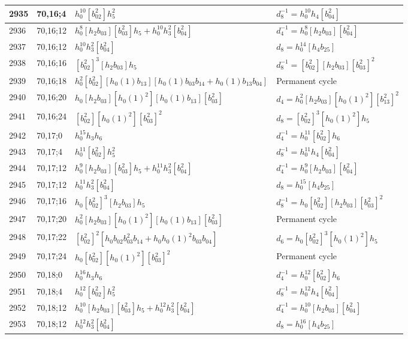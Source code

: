 \documentclass{article}
\begin{document}
\begin{longtable}{|l|l|>{\raggedright\arraybackslash}p{6cm}|>{\raggedright\arraybackslash}p{6cm}|}
\hline
2935 & 70,16;4 & $h_0^{10}[b_{02}^2]h_5^2$ & $d_{8}^{-1}=h_0^{10}h_4[b_{04}^2]$\\
\hline
2936 & 70,16;12 & $h_0^8[h_2b_{03}][b_{03}^2]h_5 + h_0^{10}h_3^2[b_{04}^2]$ & $d_{4}^{-1}=h_0^8[h_2b_{03}][b_{04}^2]$\\
2937 & 70,16;12 & $h_0^{10}h_3^2[b_{04}^2]$ &$d_{8}=h_0^{14}[h_4b_{25}]$\\
\hline
2938 & 70,16;16 & $[b_{02}^2]^3[h_2b_{03}]h_5$ & $d_{8}^{-1}=[b_{02}^2][h_2b_{03}][b_{03}^2]^2$\\
\hline
2939 & 70,16;18 & $h_0^2[b_{02}^2][h_0(1)b_{13}][h_0(1)b_{03}b_{14} + h_0(1)b_{13}b_{04}]$ & Permanent cycle\\
\hline
2940 & 70,16;20 & $h_0[h_2b_{03}][h_0(1)^2][h_0(1)b_{13}][b_{03}^2]$ &$d_{4}=h_0^2[h_2b_{03}][h_0(1)^2][b_{13}^2]^2$\\
\hline
2941 & 70,16;24 & $[b_{02}^2][h_0(1)^2][b_{03}^2]^2$ &$d_{8}=[b_{02}^2]^3[h_0(1)^2]h_5$\\
\hline
2942 & 70,17;0 & $h_0^{15}h_3h_6$ & $d_{4}^{-1}=h_0^{11}[b_{02}^2]h_6$\\
\hline
2943 & 70,17;4 & $h_0^{11}[b_{02}^2]h_5^2$ & $d_{8}^{-1}=h_0^{11}h_4[b_{04}^2]$\\
\hline
2944 & 70,17;12 & $h_0^9[h_2b_{03}][b_{03}^2]h_5 + h_0^{11}h_3^2[b_{04}^2]$ & $d_{4}^{-1}=h_0^9[h_2b_{03}][b_{04}^2]$\\
2945 & 70,17;12 & $h_0^{11}h_3^2[b_{04}^2]$ &$d_{8}=h_0^{15}[h_4b_{25}]$\\
\hline
2946 & 70,17;16 & $h_0[b_{02}^2]^3[h_2b_{03}]h_5$ & $d_{8}^{-1}=h_0[b_{02}^2][h_2b_{03}][b_{03}^2]^2$\\
\hline
2947 & 70,17;20 & $h_0^2[h_2b_{03}][h_0(1)^2][h_0(1)b_{13}][b_{03}^2]$ & Permanent cycle\\
\hline
2948 & 70,17;22 & $[b_{02}^2]^2[h_0b_{02}b_{03}^2b_{14} + h_0h_0(1)^2b_{03}b_{04}]$ &$d_{6}=h_0[b_{02}^2]^3[h_0(1)^2]h_5$\\
\hline
2949 & 70,17;24 & $h_0[b_{02}^2][h_0(1)^2][b_{03}^2]^2$ & Permanent cycle\\
\hline
2950 & 70,18;0 & $h_0^{16}h_3h_6$ & $d_{4}^{-1}=h_0^{12}[b_{02}^2]h_6$\\
\hline
2951 & 70,18;4 & $h_0^{12}[b_{02}^2]h_5^2$ & $d_{8}^{-1}=h_0^{12}h_4[b_{04}^2]$\\
\hline
2952 & 70,18;12 & $h_0^{10}[h_2b_{03}][b_{03}^2]h_5 + h_0^{12}h_3^2[b_{04}^2]$ & $d_{4}^{-1}=h_0^{10}[h_2b_{03}][b_{04}^2]$\\
2953 & 70,18;12 & $h_0^{12}h_3^2[b_{04}^2]$ &$d_{8}=h_0^{16}[h_4b_{25}]$\\

\end{longtable}
\end{document}
